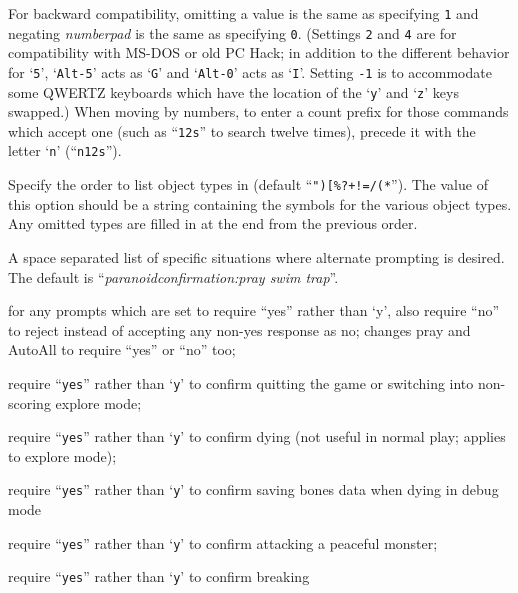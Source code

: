 \documentclass[titlepage]{article}
\begin{document}
\begin{description}[font=\mdseries\itshape]
For backward compatibility, omitting a value is the same as specifying \texttt{1}
and negating
\textit{number\textunderscore pad}
is the same as specifying \texttt{0}.
(Settings \texttt{2} and \texttt{4} are for compatibility with MS-DOS or old PC Hack;
in addition to the different behavior for `\texttt{5}', `\texttt{Alt-5}' acts as `\texttt{G}'
and `\texttt{Alt-0}' acts as `\texttt{I}'.
Setting \texttt{-1} is to accommodate some QWERTZ keyboards which have the
location of the `\texttt{y}' and `\texttt{z}' keys swapped.)
When moving by numbers, to enter a count prefix for those commands
which accept one (such as ``\texttt{12s}'' to search twelve times), precede it
with the letter `\texttt{n}' (``\texttt{n12s}'').
\item[packorder]
Specify the order to list object types in (default
``\texttt{")[\%?+!=/(*\textunderscore}''). The value of this option should be a string
containing the symbols for the various object types.  Any omitted types
are filled in at the end from the previous order.
\item[paranoid\textunderscore confirmation]
A space separated list of specific situations where alternate
prompting is desired.
The default is ``\textit{paranoid\textunderscore confirmation:pray swim trap}''.
\newlength{\pcwidth}
\addtolength{\pcwidth}{\labelsep}
\begin{description}[leftmargin=\pcwidth, topsep=1mm, itemsep=0mm, labelwidth=*, font=\ttfamily, align=right]
\item[Confirm]
for any prompts which are set to require ``yes'' rather than `y',
also require ``no'' to reject instead of accepting any non-yes response
as no; changes pray and AutoAll to require ``yes'' or ``no'' too;
\item[quit]
require ``\texttt{yes}'' rather than `\texttt{y}' to confirm quitting
the game or switching into non-scoring explore mode;
\item[die]
require ``\texttt{yes}'' rather than `\texttt{y}' to confirm dying (not
useful in normal play; applies to explore mode);
\item[bones]
require ``\texttt{yes}'' rather than `\texttt{y}' to confirm saving
bones data when dying in debug mode
\item[attack]
require ``\texttt{yes}'' rather than `\texttt{y}' to confirm attacking
a peaceful monster;
\item[wand-break]
require ``\texttt{yes}'' rather than `\texttt{y}' to confirm breaking

\end{description}
\end{description}
\end{document}

